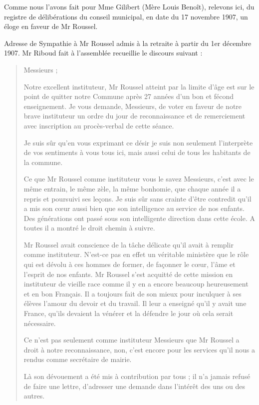 Comme nous l'avons fait pour Mme Gilibert (Mère Louis Benoît), relevons ici, du registre de délibérations du conseil municipal, en date du 17 novembre 1907, un éloge en faveur de Mr Roussel.

Adresse de Sympathie à Mr Roussel admis à la retraite à partir du 1er décembre 1907. Mr Riboud fait à l'assemblée recueillie le discours suivant :

\begin{quote}
Messieurs ;

Notre excellent instituteur, Mr Roussel atteint par la limite d'âge est sur le point de quitter notre Commune après 27 années d'un bon et fécond enseignement. Je vous demande, Messieurs, de voter en faveur de notre brave instituteur un ordre du jour de reconnaissance et de remerciement avec inscription au procès-verbal de cette séance.

Je suis sûr qu'en vous exprimant ce désir je suis non seulement l'interprète de vos sentiments à vous tous ici, mais aussi celui de tous les habitants de la commune.

Ce que Mr Roussel comme instituteur vous le savez Messieurs, c'est avec le même entrain, le même zèle, la même bonhomie, que chaque année il a repris et poursuivi ses leçons. Je suis sûr sans crainte d'être contredit qu'il a mis son cœur aussi bien que son intelligence au service de nos enfants. Des générations ont passé sous son intelligente direction dans cette école. A toutes il a montré le droit chemin à suivre.

Mr Roussel avait conscience de la tâche délicate qu'il avait à remplir comme instituteur. N'est-ce pas en effet un véritable ministère que le rôle qui est dévolu à ces hommes de former, de façonner le cœur, l'âme et l'esprit de nos enfants. Mr Roussel s'est acquitté de cette mission en instituteur de vieille race comme il y en a encore beaucoup heureusement et en bon Français. Il a toujours fait de son mieux pour inculquer à ses élèves l'amour du devoir et du travail. Il leur a enseigné qu'il y avait une France, qu'ils devaient la vénérer et la défendre le jour où cela serait nécessaire.

Ce n'est pas seulement comme instituteur Messieurs que Mr Roussel a droit à notre reconnaissance, non, c'est encore pour les services qu'il nous a rendus comme secrétaire de mairie.

Là son dévouement a été mis à contribution par tous ; il n'a jamais refusé de faire une lettre, d'adresser une demande dans l'intérêt des uns ou des autres.


\end{quote}
